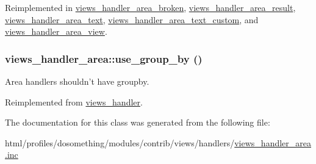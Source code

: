 Reimplemented in \hyperlink{classviews__handler__area__broken_aa56616948891521539f0f4b59e20307f}{views\_\-handler\_\-area\_\-broken}, \hyperlink{classviews__handler__area__result_acd805154305ee5849da8251a4335c933}{views\_\-handler\_\-area\_\-result}, \hyperlink{classviews__handler__area__text_a61ad1d6b876311e1d09576230654a794}{views\_\-handler\_\-area\_\-text}, \hyperlink{classviews__handler__area__text__custom_a04acaaef479eb115b7912b963967387c}{views\_\-handler\_\-area\_\-text\_\-custom}, and \hyperlink{classviews__handler__area__view_a475224309a7f09c2101477edf73541e5}{views\_\-handler\_\-area\_\-view}.\hypertarget{classviews__handler__area_afd0f5987bb450217d97f6fb5607e5f70}{
\subsubsection[{use\_\-group\_\-by}]{\setlength{\rightskip}{0pt plus 5cm}views\_\-handler\_\-area::use\_\-group\_\-by ()}}
\label{classviews__handler__area_afd0f5987bb450217d97f6fb5607e5f70}
Area handlers shouldn't have groupby. 

Reimplemented from \hyperlink{classviews__handler_a929fa734f0c231cb81f52889652e6aef}{views\_\-handler}.

The documentation for this class was generated from the following file:\begin{DoxyCompactItemize}
\item 
html/profiles/dosomething/modules/contrib/views/handlers/\hyperlink{views__handler__area_8inc}{views\_\-handler\_\-area.inc}\end{DoxyCompactItemize}

